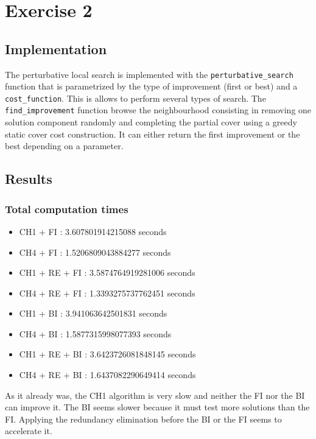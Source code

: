 \documentclass[a4paper,12pt]{article}
\begin{document}
\section{Exercise 2}

\subsection{Implementation}

The perturbative local search is implemented with the \texttt{perturbative\_search} function that is parametrized by the type of improvement (first or best) and a \texttt{cost\_function}. This is allows to perform several types of search. 
The \texttt{find\_improvement} function browse the neighbourhood consisting in removing one solution component randomly and completing the partial cover using a greedy static cover cost construction. It can either return the first improvement or the best depending on a parameter.

\subsection{Results}

\subsubsection{Total computation times}

\begin{itemize}
    \item CH1 + FI : 3.607801914215088 seconds
    \item CH4 + FI : 1.5206809043884277 seconds
    \item CH1 + RE + FI : 3.5874764919281006 seconds
    \item CH4 + RE + FI : 1.3393275737762451 seconds
    \item CH1 + BI : 3.941063642501831 seconds
    \item CH4 + BI : 1.5877315998077393 seconds
    \item CH1 + RE + BI : 3.6423726081848145 seconds
    \item CH4 + RE + BI : 1.6437082290649414 seconds
\end{itemize}

As it already was, the CH1 algorithm is very slow and neither the FI nor the BI can improve it. The BI seems slower because it must test more solutions than the FI. Applying the redundancy elimination before the BI or the FI seems to accelerate it.
\end{document}
